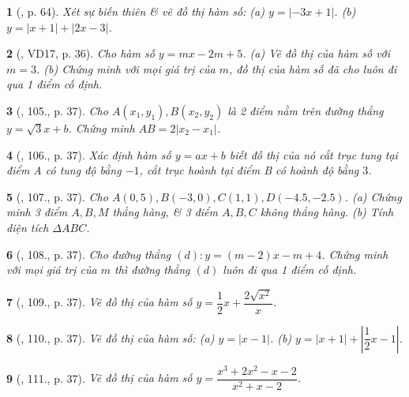 \documentclass{article}
\newtheorem{baitoan}{}
\begin{document}
\begin{baitoan}[\cite{Binh_boi_duong_Toan_9_tap_1}, p. 64]
	Xét sự biến thiên \& vẽ đồ thị hàm số: (a) $y = |-3x + 1|$. (b) $y = |x + 1| + |2x - 3|$.
\end{baitoan}

\begin{baitoan}[\cite{Tuyen_Toan_9_old}, VD17, p. 36]
	Cho hàm số $y = mx - 2m + 5$. (a) Vẽ đồ thị của hàm số với $m = 3$. (b) Chứng minh với mọi giá trị của $m$, đồ thị của hàm số đã cho luôn đi qua 1 điểm cố định.
\end{baitoan}

\begin{baitoan}[\cite{Tuyen_Toan_9_old}, 105., p. 37]
	Cho $A(x_1,y_1),B(x_2,y_2)$ là 2 điểm nằm trên đường thẳng $y = \sqrt{3}x + b$. Chứng minh $AB = 2|x_2 - x_1|$.
\end{baitoan}

\begin{baitoan}[\cite{Tuyen_Toan_9_old}, 106., p. 37]
	Xác định hàm số $y = ax + b$ biết đồ thị của nó cắt trục tung tại điểm A có tung độ bằng $-1$, cắt trục hoành tại điểm B có hoành độ bằng $3$.
\end{baitoan}

\begin{baitoan}[\cite{Tuyen_Toan_9_old}, 107., p. 37]
	Cho $A(0,5),B(-3,0),C(1,1),D(-4.5,-2.5)$. (a) Chứng minh 3 điểm $A,B,M$ thẳng hàng, \& 3 điểm $A,B,C$ không thẳng hàng. (b) Tính diện tích $\Delta ABC$.
\end{baitoan}

\begin{baitoan}[\cite{Tuyen_Toan_9_old}, 108., p. 37]
	Cho đường thẳng $(d):y = (m - 2)x - m + 4$. Chứng minh với mọi giá trị của $m$ thì đường thẳng $(d)$ luôn đi qua 1 điểm cố định.
\end{baitoan}

\begin{baitoan}[\cite{Tuyen_Toan_9_old}, 109., p. 37]
	Vẽ đồ thị của hàm số $y = \dfrac{1}{2}x + \dfrac{2\sqrt{x^2}}{x}$.
\end{baitoan}

\begin{baitoan}[\cite{Tuyen_Toan_9_old}, 110., p. 37]
	Vẽ đồ thị của hàm số: (a) $y = |x - 1|$. (b) $y = |x + 1| + \left|\dfrac{1}{2}x - 1\right|$.
\end{baitoan}

\begin{baitoan}[\cite{Tuyen_Toan_9_old}, 111., p. 37]
	Vẽ đồ thị của hàm số $y = \dfrac{x^3 + 2x^2 - x - 2}{x^2 + x - 2}$.
\end{baitoan}
\end{document}
